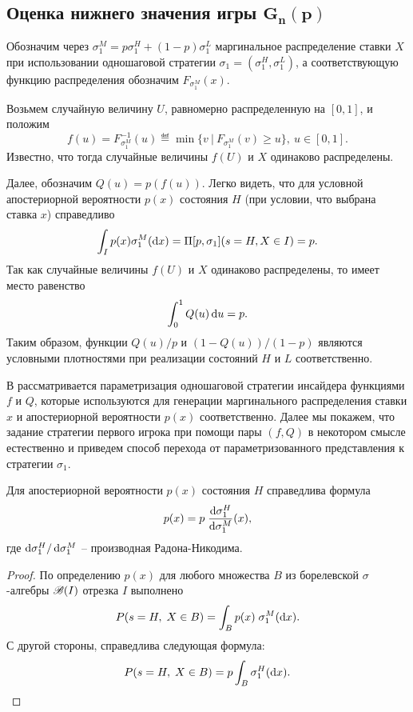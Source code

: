 {\subsection{Оценка нижнего значения игры $\mathbf{ G_{n}(p) }$}
\label{ch3:sec:-primal-game}

Обозначим через $\sigma^M_1 = p \sigma^H_1 + (1-p) \sigma^L_1$ маргинальное распределение ставки $X$ при использовании одношаговой стратегии $\sigma_1 = (\sigma^H_1, \sigma^L_1)$, а соответствующую функцию распределения обозначим $F_{\sigma^M_1}(x)$.

Возьмем случайную величину $U$, равномерно распределенную на $[0, 1]$, и положим
\begin{equation*}
  f(u) = F^{-1}_{\sigma^M_1}(u)
  \eqdef \min \{ v\ |\ F_{\sigma^M_1}(v) \geq u \},\ u \in [0, 1].
\end{equation*}
Известно, что тогда случайные величины $f(U)$ и $X$ одинаково распределены.

Далее, обозначим $Q(u) = p(f(u))$.
Легко видеть, что для условной апостериорной вероятности $p(x)$ состояния $H$ (при условии, что выбрана ставка $x$) справедливо
\begin{equation*}
  \int_I p(x) \sigma^M_1(\mathop{}\!\mathrm{d} x) = \Pi[p, \sigma_1](s = H, X \in I) = p.
\end{equation*}
Так как случайные величины $f(U)$ и $X$ одинаково распределены, то имеет место равенство
\begin{equation*}
  \int_0^1 Q(u) \mathop{}\!\mathrm{d} u = p.
\end{equation*}
Таким образом, функции $Q(u)/p$ и $(1-Q(u))/(1-p)$ являются условными плотностями при реализации состояний $H$ и $L$ соответственно.

В \cite{demeyer02} рассматривается параметризация одношаговой стратегии инсайдера функциями $f$ и $Q$, которые используются для генерации маргинального распределения ставки $x$ и апостериорной вероятности $p(x)$ соответственно.
Далее мы покажем, что задание стратегии первого игрока при помощи пары $(f, Q)$ в некотором смысле естественно и приведем способ перехода от параметризованного представления к стратегии $\sigma_1$.

\begin{proposition}
  Для апостериорной вероятности $p(x)$ состояния $H$ справедлива формула
  \begin{equation}\label{ch3:eq:p(x)}
    p(x) = p \; \frac{\mathop{}\!\mathrm{d} \sigma^H_1}{\mathop{}\!\mathrm{d} \sigma^M_1}(x),
  \end{equation}
  где $\mathop{}\!\mathrm{d} \sigma^H_1/\mathop{}\!\mathrm{d} \sigma^M_1$ -- производная Радона-Никодима.
\end{proposition}
\begin{proof}
  По определению $p(x)$ для любого множества $B$ из борелевской $\sigma$-алгебры $\mathscr{B}(I)$ отрезка $I$ выполнено
  \begin{equation*}
    P(s = H, \; X \in B) = \int_B p(x) \; \sigma^M_1(\mathop{}\!\mathrm{d} x).
  \end{equation*}
  С другой стороны, справедлива следующая формула:
  \begin{equation*}
    P(s = H, \; X \in B) = p \int_B \sigma^H_1(\mathop{}\!\mathrm{d} x).
  \end{equation*}


\end{proof}}
